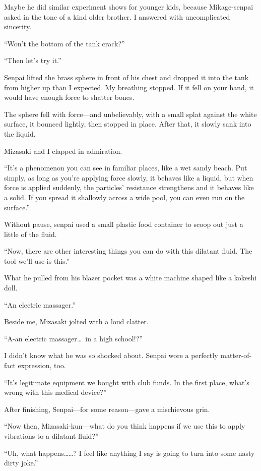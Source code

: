 \documentclass[
    a4paper,
    12pt,
    twoside,
    openany,
    UTF8,
    fontset=windows
]{ctexbook}
\begin{document}
Maybe he did similar experiment shows for younger kids, because Mikage-senpai asked in the tone of a kind older brother. I answered with uncomplicated sincerity.

``Won't the bottom of the tank crack?''

``Then let's try it.''

Senpai lifted the brass sphere in front of his chest and dropped it into the tank from higher up than I expected. My breathing stopped. If it fell on your hand, it would have enough force to shatter bones.

The sphere fell with force---and unbelievably, with a small splat against the white surface, it bounced lightly, then stopped in place. After that, it slowly sank into the liquid.

Mizasaki and I clapped in admiration.

``It's a phenomenon you can see in familiar places, like a wet sandy beach. Put simply, as long as you're applying force slowly, it behaves like a liquid, but when force is applied suddenly, the particles' resistance strengthens and it behaves like a solid. If you spread it shallowly across a wide pool, you can even run on the surface.''

Without pause, senpai used a small plastic food container to scoop out just a little of the fluid.

``Now, there are other interesting things you can do with this dilatant fluid. The tool we'll use is this.''

What he pulled from his blazer pocket was a white machine shaped like a kokeshi doll.

``An electric massager.''

Beside me, Mizasaki jolted with a loud clatter.

``A-an electric massager\dots\ in a high school!?''

I didn't know what he was so shocked about. Senpai wore a perfectly matter-of-fact expression, too.

``It's legitimate equipment we bought with club funds. In the first place, what's wrong with this medical device?''

After finishing, Senpai---for some reason---gave a mischievous grin.

``Now then, Mizasaki-kun---what do you think happens if we use this to apply vibrations to a dilatant fluid?''

``Uh, what happens\dots\dots? I feel like anything I say is going to turn into some nasty dirty joke.''
\end{document}
